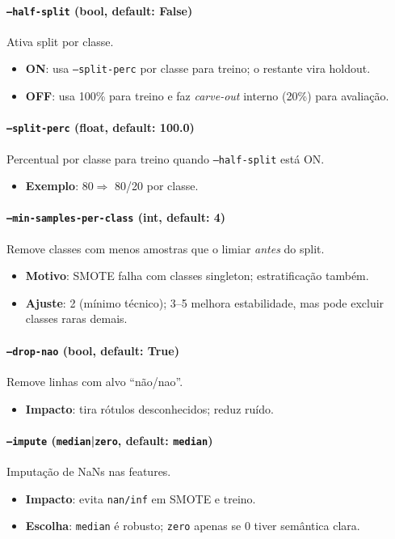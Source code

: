 \documentclass[11pt,a4paper]{article}
\begin{document}
\paragraph{\texttt{--half-split} (bool, default: False)} Ativa split por classe.
\begin{itemize}[leftmargin=1.2em]
  \item \textbf{ON}: usa \texttt{--split-perc} por classe para treino; o restante vira holdout.
  \item \textbf{OFF}: usa 100\% para treino e faz \emph{carve-out} interno (20\%) para avaliação.
\end{itemize}

\paragraph{\texttt{--split-perc} (float, default: 100.0)} Percentual por classe para treino quando \texttt{--half-split} está ON.
\begin{itemize}[leftmargin=1.2em]
  \item \textbf{Exemplo}: 80$\Rightarrow$ 80/20 por classe.
\end{itemize}

\paragraph{\texttt{--min-samples-per-class} (int, default: 4)} Remove classes com menos amostras que o limiar \emph{antes} do split.
\begin{itemize}[leftmargin=1.2em]
  \item \textbf{Motivo}: SMOTE falha com classes singleton; estratificação também.
  \item \textbf{Ajuste}: 2 (mínimo técnico); 3--5 melhora estabilidade, mas pode excluir classes raras demais.
\end{itemize}

\paragraph{\texttt{--drop-nao} (bool, default: True)} Remove linhas com alvo ``não/nao''.
\begin{itemize}[leftmargin=1.2em]
  \item \textbf{Impacto}: tira rótulos desconhecidos; reduz ruído.
\end{itemize}

\paragraph{\texttt{--impute} (\texttt{median}|\texttt{zero}, default: \texttt{median})} Imputação de NaNs nas features.
\begin{itemize}[leftmargin=1.2em]
  \item \textbf{Impacto}: evita \texttt{nan/inf} em SMOTE e treino.
  \item \textbf{Escolha}: \texttt{median} é robusto; \texttt{zero} apenas se 0 tiver semântica clara.
\end{itemize}
\end{document}
